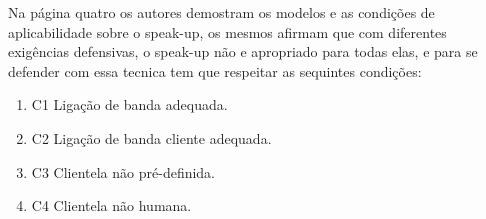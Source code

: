 \documentclass[a4paper,12pt]{article}
\begin{document}
Na página quatro os autores demostram os modelos e as condições de aplicabilidade sobre o  speak-up, os mesmos afirmam que com diferentes exigências defensivas, o speak-up não e apropriado para todas elas, e para se defender com essa tecnica tem que respeitar as sequintes condições: 
\vspace{1cm}
\begin{enumerate}
	\item{C1} Ligação de banda adequada.

	\item{C2} Ligação de banda cliente adequada.

	\item{C3} Clientela não pré-definida.

	\item{C4} Clientela não humana.

\end{enumerate}

\vspace{3cm}
\begin{center}
\end{center}

 
\end{document}
